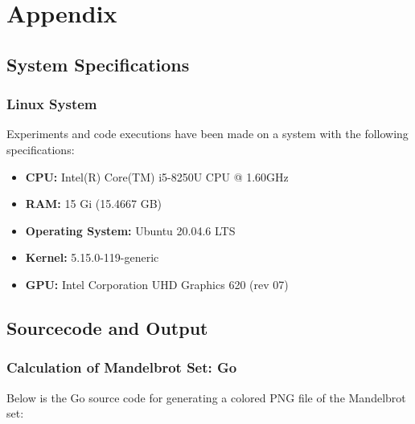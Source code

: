 \chapter{Appendix}

\section{System Specifications}

\subsection{Linux System}
\label{app:system:mymachine}
Experiments and code executions have been made on a system with the following specifications:

\begin{itemize}
    \item \textbf{CPU:} Intel(R) Core(TM) i5-8250U CPU @ 1.60GHz
    \item \textbf{RAM:} 15 Gi (15.4667 GB)
    \item \textbf{Operating System:} Ubuntu 20.04.6 LTS
    \item \textbf{Kernel:} 5.15.0-119-generic
    \item \textbf{GPU:} Intel Corporation UHD Graphics 620 (rev 07)
\end{itemize}

\section{Sourcecode and Output}

\subsection{Calculation of Mandelbrot Set: Go}
\label{app:code:mandelbrot1}
Below is the Go source code for generating a colored PNG file of the Mandelbrot set:

